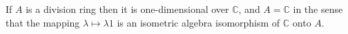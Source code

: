 If $A$ is a division ring then it is one-dimensional over $\mathbb{C}$, and $A = \mathbb{C}$ in the sense that the mapping $\lambda \mapsto \lambda 1$ is an isometric algebra isomorphism of $\mathbb{C}$ onto $A$.
